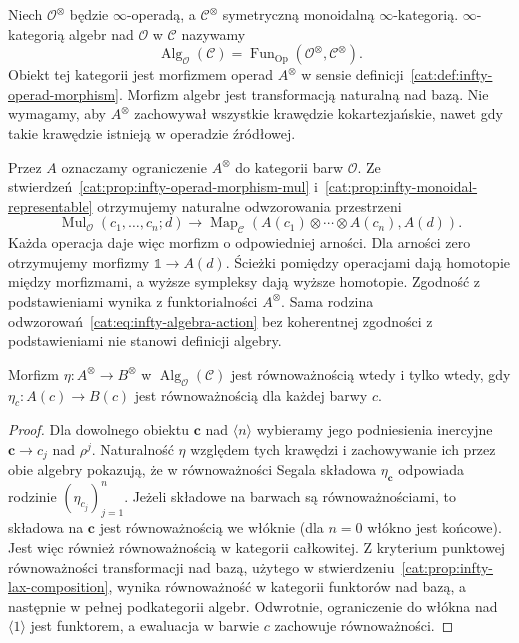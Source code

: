 \begin{definicja}\label{cat:def:infty-operad-algebra}
Niech $\mathcal O^\otimes$ będzie $\infty$-operadą, a $\mathcal C^\otimes$ symetryczną monoidalną $\infty$-kategorią. $\infty$-kategorią algebr nad $\mathcal O$ w $\mathcal C$ nazywamy
\[
 \operatorname{Alg}_{\mathcal O}(\mathcal C)
 =\operatorname{Fun}_{\mathrm{Op}}(\mathcal O^\otimes,\mathcal C^\otimes).
\]
Obiekt tej kategorii jest morfizmem operad $A^\otimes$ w sensie definicji~\ref{cat:def:infty-operad-morphism}. Morfizm algebr jest transformacją naturalną nad bazą. Nie wymagamy, aby $A^\otimes$ zachowywał wszystkie krawędzie kokartezjańskie, nawet gdy takie krawędzie istnieją w operadzie źródłowej.
\end{definicja}

Przez $A$ oznaczamy ograniczenie $A^\otimes$ do kategorii barw $\mathcal O$. Ze stwierdzeń~\ref{cat:prop:infty-operad-morphism-mul} i~\ref{cat:prop:infty-monoidal-representable} otrzymujemy naturalne odwzorowania przestrzeni
\begin{equation}\label{cat:eq:infty-algebra-action}
 \operatorname{Mul}_{\mathcal O}(c_1,\ldots,c_n;d)
 \longrightarrow
 \operatorname{Map}_{\mathcal C}
 (A(c_1)\otimes\cdots\otimes A(c_n),A(d)).
\end{equation}
Każda operacja daje więc morfizm o odpowiedniej arności. Dla arności zero otrzymujemy morfizmy $\mathbb 1\to A(d)$. Ścieżki pomiędzy operacjami dają homotopie między morfizmami, a wyższe sympleksy dają wyższe homotopie. Zgodność z podstawieniami wynika z funktorialności $A^\otimes$. Sama rodzina odwzorowań~\eqref{cat:eq:infty-algebra-action} bez koherentnej zgodności z podstawieniami nie stanowi definicji algebry.

\begin{stwierdzenie}\label{cat:prop:infty-algebra-equivalences}
Morfizm $\eta:A^\otimes\to B^\otimes$ w $\operatorname{Alg}_{\mathcal O}(\mathcal C)$ jest równoważnością wtedy i tylko wtedy, gdy $\eta_c:A(c)\to B(c)$ jest równoważnością dla każdej barwy $c$.
\end{stwierdzenie}
\begin{proof}
Dla dowolnego obiektu $\mathbf c$ nad $\langle n\rangle$ wybieramy jego podniesienia inercyjne $\mathbf c\to c_j$ nad $\rho^j$. Naturalność $\eta$ względem tych krawędzi i zachowywanie ich przez obie algebry pokazują, że w równoważności Segala składowa $\eta_{\mathbf c}$ odpowiada rodzinie $(\eta_{c_j})_{j=1}^n$. Jeżeli składowe na barwach są równoważnościami, to składowa na $\mathbf c$ jest równoważnością we włóknie (dla $n=0$ włókno jest końcowe). Jest więc również równoważnością w kategorii całkowitej. Z kryterium punktowej równoważności transformacji nad bazą, użytego w stwierdzeniu~\ref{cat:prop:infty-lax-composition}, wynika równoważność w kategorii funktorów nad bazą, a następnie w pełnej podkategorii algebr. Odwrotnie, ograniczenie do włókna nad $\langle1\rangle$ jest funktorem, a ewaluacja w barwie $c$ zachowuje równoważności.
\end{proof}

